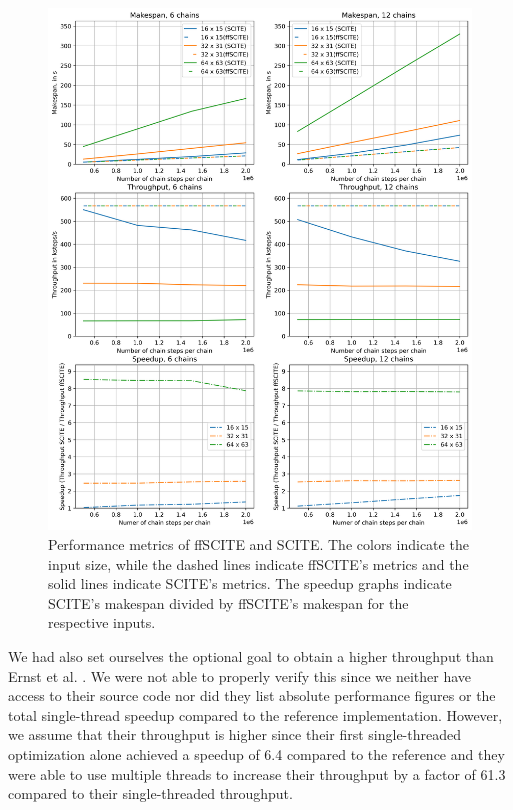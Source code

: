 
\begin{figure}
    \includegraphics[width=\textwidth]{figures/performance.png}
    \caption{Performance metrics of \ac{ffSCITE} and \ac{SCITE}. The colors indicate the input size, while the dashed lines indicate \ac{ffSCITE}'s metrics and the solid lines indicate \ac{SCITE}'s metrics. The speedup graphs indicate \ac{SCITE}'s makespan divided by \ac{ffSCITE}'s makespan for the respective inputs.}
    \label{fig:performance}
\end{figure}

We had also set ourselves the optional goal to obtain a higher throughput than Ernst et al. \cite{ernst2020Performance}. We were not able to properly verify this since we neither have access to their source code nor did they list absolute performance figures or the total single-thread speedup compared to the reference implementation. However, we assume that their throughput is higher since their first single-threaded optimization alone achieved a speedup of 6.4 compared to the reference and they were able to use multiple threads to increase their throughput by a factor of 61.3 compared to their single-threaded throughput.